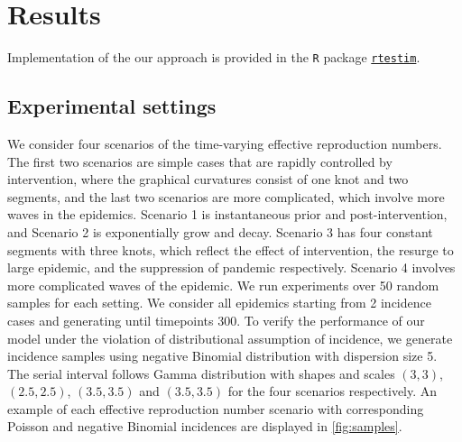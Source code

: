 \section{Results}

Implementation of the our approach is provided in the \texttt{R} package \href{https://dajmcdon.github.io/rtestim/}{\texttt{rtestim}}. 


\subsection{Experimental settings}

We consider four scenarios of the time-varying effective reproduction numbers. The first two scenarios are simple cases that are rapidly controlled by intervention, where the graphical curvatures consist of one knot and two segments, and the last two scenarios are more complicated, which involve more waves in the epidemics. Scenario 1 is instantaneous prior and post-intervention, and Scenario 2 is exponentially grow and decay. Scenario 3 has four constant segments with three knots, which reflect the effect of intervention, the resurge to large epidemic, and the suppression of pandemic respectively. Scenario 4 involves more complicated waves of the epidemic. 
We run experiments over 50 random samples for each setting. We consider all epidemics starting from 2 incidence cases and generating until timepoints 300. 
% 
To verify the performance of our model under the violation of distributional assumption of incidence, we generate incidence samples using negative Binomial distribution with dispersion size 5. The serial interval follows Gamma distribution with shapes and scales $(3,3)$, $(2.5,2.5)$, $(3.5,3.5)$ and $(3.5,3.5)$ for the four scenarios respectively. 
An example of each effective reproduction number scenario with corresponding Poisson and negative Binomial incidences are displayed in \autoref{fig:samples}. 

